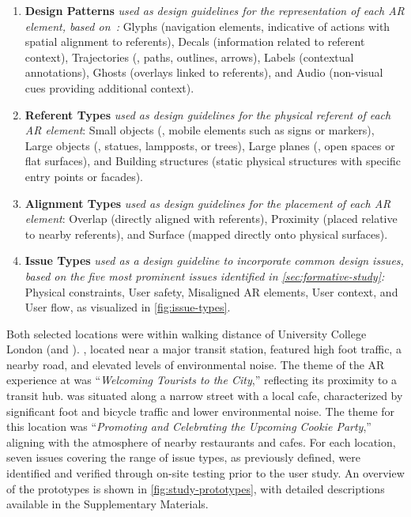 \begin{enumerate}
    \item \textbf{Design Patterns} \textit{used as design guidelines for the representation of each AR element, based on~\cite{leeDesignPatternsSituated2023}:} Glyphs (navigation elements, indicative of actions with spatial alignment to referents), Decals (information related to referent context), Trajectories (\eg, paths, outlines, arrows), Labels (contextual annotations), Ghosts (overlays linked to referents), and Audio (non-visual cues providing additional context).
    
    \item \textbf{Referent Types} \textit{used as design guidelines for the physical referent of each AR element}: Small objects (\eg, mobile elements such as signs or markers), Large objects (\eg, statues, lampposts, or trees), Large planes (\eg, open spaces or flat surfaces), and Building structures (static physical structures with specific entry points or facades).
    
    \item \textbf{Alignment Types} \textit{used as design guidelines for the placement of each AR element}: Overlap (directly aligned with referents), Proximity (placed relative to nearby referents), and Surface (mapped directly onto physical surfaces).
    
    \item \textbf{Issue Types} \textit{used as a design guideline to incorporate common design issues, based on the five most prominent issues identified in \cref{sec:formative-study}:} Physical constraints, User safety, Misaligned AR elements, User context, and User flow, as visualized in \cref{fig:issue-types}.
\end{enumerate}

Both selected locations were within walking distance of University College London (\locA and \locB). \locA, located near a major transit station, featured high foot traffic, a nearby road, and elevated levels of environmental noise. The theme of the AR experience at \locA was ``\textit{Welcoming Tourists to the City},'' reflecting its proximity to a transit hub. \locB was situated along a narrow street with a local cafe, characterized by significant foot and bicycle traffic and lower environmental noise. The theme for this location was ``\textit{Promoting and Celebrating the Upcoming Cookie Party},'' aligning with the atmosphere of nearby restaurants and cafes. For each location, seven issues covering the range of issue types, as previously defined, were identified and verified through on-site testing prior to the user study. An overview of the prototypes is shown in \cref{fig:study-prototypes}, with detailed descriptions available in the Supplementary Materials.

